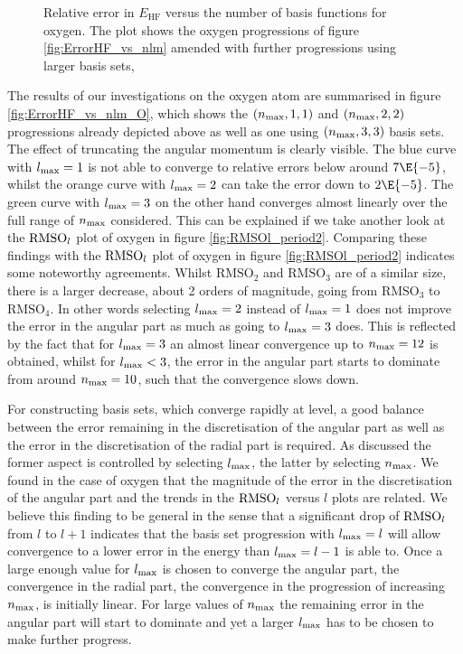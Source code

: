 \begin{figure}
	\centering
	\caption[
		Relative error in $E_\text{HF}$ versus the number of basis functions
		for oxygen.
	]{
		Relative error in $E_\text{HF}$ versus the number of basis functions
		for oxygen.
		The plot shows the oxygen progressions of figure \ref{fig:ErrorHF_vs_nlm}
		amended with further progressions using larger basis sets,
	}
	\label{fig:ErrorHF_vs_nlm_O}
\end{figure}
The results of our investigations on the oxygen atom are summarised in figure
\vref{fig:ErrorHF_vs_nlm_O}, which shows
the $(n_\text{max}, 1,1)$ and $(n_\text{max}, 2,2)$ progressions already depicted above
as well as one using $(n_\text{max}, 3,3)$ \CS basis sets.
The effect of truncating the angular momentum is clearly visible.
The blue curve with $l_\text{max} =1$ is not able to converge to relative errors
below around $7\E{-5}$,
whilst the orange curve with $l_\text{max} = 2$ can take the error
down to $2\E{-5}$.
The green curve with $l_\text{max} = 3$ on the other hand
converges almost linearly over the full range of $n_\text{max}$ considered.
This can be explained if we take another look at the
$\text{RMSO}_l$ plot of oxygen in figure \ref{fig:RMSOl_period2}.
Comparing these findings with the $\text{RMSO}_l$ plot of oxygen
in figure \ref{fig:RMSOl_period2} indicates some noteworthy agreements.
Whilst $\text{RMSO}_2$ and $\text{RMSO}_3$ are of a similar size,
there is a larger decrease, about 2 orders of magnitude,
going from $\text{RMSO}_3$ to $\text{RMSO}_4$.
In other words selecting $l_\text{max} = 2$ instead of $l_\text{max} = 1$
does not improve the error in the angular part
as much as going to $l_\text{max} = 3$ does.
This is reflected by the fact that for $l_\text{max} = 3$
an almost linear convergence up to $n_\text{max} = 12$ is obtained,
whilst for $l_\text{max} < 3$, the error in the angular part starts to dominate
from around $n_\text{max} = 10$, such that the convergence slows down.

For constructing \CS basis sets, which converge rapidly at \HF level,
a good balance between the error remaining in the discretisation of the angular
part as well as the error in the discretisation of the radial part is required.
As discussed the former aspect is controlled by selecting $l_\text{max}$,
the latter by selecting $n_\text{max}$.
We found in the case of oxygen that the magnitude of the error
in the discretisation of the angular part and the trends in the $\text{RMSO}_l$ versus $l$
plots are related.
We believe this finding to be general
in the sense that a significant drop of $\text{RMSO}_l$
from $l$ to $l+1$ indicates
that the \CS basis set progression with $l_\text{max} = l$
will allow convergence to a lower error in the \HF energy
than $l_\text{max} = l-1$ is able to.
Once a large enough value for $l_\text{max}$ is chosen to converge the angular part,
the convergence in the radial part,
\ie the convergence in the progression of increasing $n_\text{max}$,
is initially linear.
For large values of $n_\text{max}$ the remaining error in the angular part
will start to dominate and yet a larger $l_\text{max}$
has to be chosen to make further progress.

